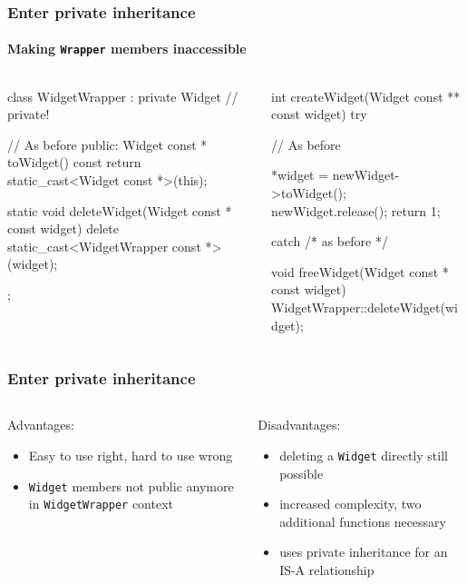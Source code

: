 \documentclass{beamer}
\def\code#1{\texttt{#1}}
\def\titleinframe#1{{\usebeamercolor[fg]{structure} #1}}
\begin{document}
\begin{frame}[fragile]
\frametitle{Enter private inheritance}
\framesubtitle{Making \code{Wrapper} members inaccessible}
\begin{columns}
\begin{column}{0.45\textwidth}
\begin{TinyC++}
class WidgetWrapper : private Widget // private!
{
	// As before
public:	
	Widget const * toWidget() const
	{
		return static_cast<Widget const *>(this);
	}
	
	static void deleteWidget(Widget const * const widget)
	{
		delete static_cast<WidgetWrapper const *>(widget);
	}
};
\end{TinyC++}
\end{column}
\begin{column}{0.45\textwidth}
\begin{TinyC++}
int createWidget(Widget const ** const widget)
try
{
	// As before
    
	*widget = newWidget->toWidget();
	newWidget.release();
	return 1;
}
catch /* as before */
\end{TinyC++}

\begin{TinyC++}
void freeWidget(Widget const * const widget)
{
	WidgetWrapper::deleteWidget(widget);
}
\end{TinyC++}
\end{column}
\end{columns}
\end{frame}


\begin{frame}[fragile]
\frametitle{Enter private inheritance}
\begin{columns}[T]
\begin{column}{0.45\textwidth}
	\titleinframe{Advantages:}
	
	\medskip
	\begin{itemize}
	\item Easy to use right, hard to use wrong
	\item \code{Widget} members not public anymore in \code{WidgetWrapper} context
	\end{itemize}
\end{column}
\begin{column}{0.45\textwidth}
	\titleinframe{Disadvantages:}
	
	\medskip
	\begin{itemize}
	\item deleting a \code{Widget} directly still possible
	\item increased complexity, two additional functions necessary
	\item uses private inheritance for an IS-A relationship
	\end{itemize}
\end{column}
\end{columns}
\end{frame}
\end{document}
